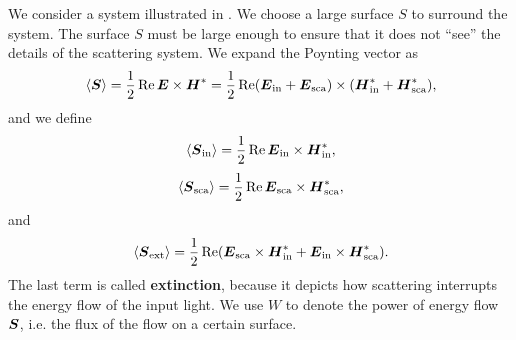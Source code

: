 \documentclass[hyperref, a4paper]{article}
\newcommand*{\concept}[1]{{\textbf{#1}}}
\begin{document}
We consider a system illustrated in . We choose a large surface $S$ to surround the 
system. The surface $S$ must be large enough to ensure that it does not ``see'' the details of the scattering 
system. We expand the Poynting vector as  
\begin{equation}
    \expval*{\vb*{S}} = \frac{1}{2} \Re \vb*{E} \times \vb*{H}^* 
    = \frac{1}{2} \Re (\vb*{E}_\text{in} + \vb*{E}_\text{sca}) \times (\vb*{H}_\text{in}^* + \vb*{H}_\text{sca}^*),
\end{equation}
and we define 
\begin{equation}
    \expval*{\vb*{S}_\text{in}} = \frac{1}{2} \Re \vb*{E}_\text{in} \times \vb*{H}_\text{in}^*,
\end{equation}
\begin{equation}
    \expval*{\vb*{S}_\text{sca}} = \frac{1}{2} \Re \vb*{E}_\text{sca} \times \vb*{H}_\text{sca}^*,
\end{equation}
and 
\begin{equation}
    \expval*{\vb*{S}_\text{ext}} = \frac{1}{2} \Re (\vb*{E}_\text{sca} \times \vb*{H}_\text{in}^* + \vb*{E}_\text{in} \times \vb*{H}_\text{sca}^*).
\end{equation}
The last term is called \concept{extinction}, because it depicts how scattering interrupts the energy flow of 
the input light. We use $W$ to denote the power of energy flow $\vb*{S}$, i.e. the flux of the flow on a certain 
surface.
\end{document}
